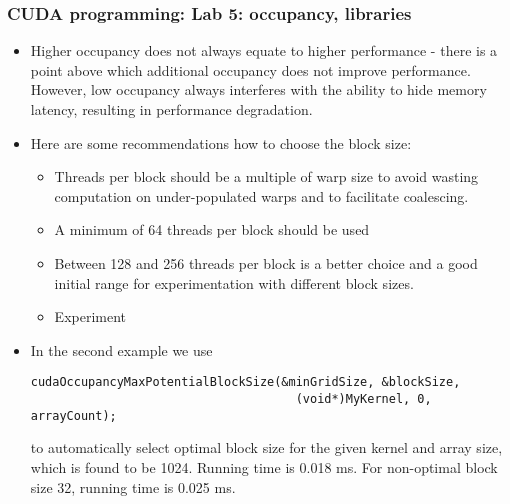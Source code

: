 \begin{frame}[fragile]
  \frametitle{CUDA programming: Lab 5: occupancy, libraries}
  \begin{itemize}
  \item Higher occupancy does not always equate to higher performance - there is a point above
    which additional occupancy does not improve performance. However, low occupancy always 
    interferes with the ability to hide memory latency, resulting in performance
    degradation.
  \item Here are some recommendations how to choose the block size:
    \begin{itemize}
    \item Threads per block should be a multiple of warp size to avoid wasting computation
      on under-populated warps and to facilitate coalescing.
    \item A minimum of 64 threads per block should be used
    \item Between 128 and 256 threads per block is a better choice and a good initial range for
      experimentation with different block sizes.
    \item Experiment
    \end{itemize}
  \item In the second example we use
{\tiny
{\color{mycolorcode}
\begin{verbatim}
cudaOccupancyMaxPotentialBlockSize(&minGridSize, &blockSize, 
                                     (void*)MyKernel, 0, arrayCount);
\end{verbatim}
}
}
to automatically select optimal block size for the given kernel and array size, which is found to be 1024. Running time is 0.018 ms. For non-optimal block size 32, running time is 0.025 ms.
  \end{itemize}
\end{frame}